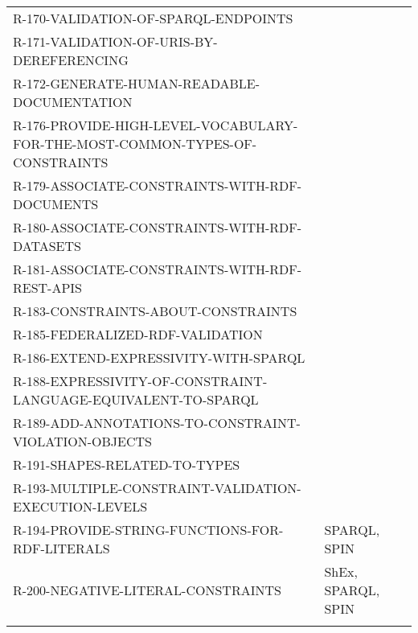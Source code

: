 \documentclass{llncs}
\newcommand{\hr}{\hline\noalign{\smallskip}} %
\begin{document}
\begin{table}
\begin{tabular}{ll}
R-170-VALIDATION-OF-SPARQL-ENDPOINTS & \\
R-171-VALIDATION-OF-URIS-BY-DEREFERENCING & \\
R-172-GENERATE-HUMAN-READABLE-DOCUMENTATION & \\
R-176-PROVIDE-HIGH-LEVEL-VOCABULARY-FOR-THE-MOST-COMMON-TYPES-OF-CONSTRAINTS & \\
R-179-ASSOCIATE-CONSTRAINTS-WITH-RDF-DOCUMENTS & \\
R-180-ASSOCIATE-CONSTRAINTS-WITH-RDF-DATASETS & \\
R-181-ASSOCIATE-CONSTRAINTS-WITH-RDF-REST-APIS & \\
R-183-CONSTRAINTS-ABOUT-CONSTRAINTS & \\
R-185-FEDERALIZED-RDF-VALIDATION & \\
R-186-EXTEND-EXPRESSIVITY-WITH-SPARQL & \\
R-188-EXPRESSIVITY-OF-CONSTRAINT-LANGUAGE-EQUIVALENT-TO-SPARQL & \\
R-189-ADD-ANNOTATIONS-TO-CONSTRAINT-VIOLATION-OBJECTS & \\
R-191-SHAPES-RELATED-TO-TYPES & \\
R-193-MULTIPLE-CONSTRAINT-VALIDATION-EXECUTION-LEVELS & \\
R-194-PROVIDE-STRING-FUNCTIONS-FOR-RDF-LITERALS & SPARQL, SPIN \\
R-200-NEGATIVE-LITERAL-CONSTRAINTS & ShEx, SPARQL, SPIN \\
\hr
\end{tabular}
\end{table}
\end{document}
